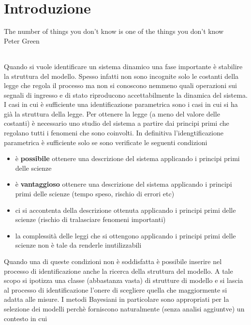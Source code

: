 \documentclass[10pt,a4paper,oneside,openany]{book}
\begin{document}
\chapter{Introduzione}
\begin{minipage}{0.5\textwidth}
\noindent
The number of things you don't know is one of the things you don't know\vspace{1em}\\Peter Green
\end{minipage}\vspace{3em}\\
Quando si vuole identificare un sistema dinamico una fase importante è stabilire la struttura del modello. Spesso infatti non sono incognite solo le costanti della legge che regola il processo ma non si conoscono nemmeno quali operazioni sui segnali di ingresso e di stato riproducono accettabilmente la dinamica del sistema.\\
I casi in cui è sufficiente una identificazione parametrica sono i casi in cui si ha già la struttura della legge. Per ottenere la legge (a meno del valore delle costanti) è necessario uno studio del sistema a partire dai principi primi che regolano tutti i fenomeni che sono coinvolti. In definitiva l'idengtificazione parametrica è sufficiente solo se sono verificate le seguenti condizioni
\begin{itemize}
\item è \textbf{possibile} ottenere una descrizione del sistema applicando i principi primi delle scienze
\item è \textbf{vantaggioso} ottenere una descrizione del sistema applicando i principi primi delle scienze (tempo speso, rischio di errori etc)
\item ci si accontenta della descrizione ottenuta applicando i principi primi delle scienze (rischio di tralasciare fenomeni importanti)
\item la complessità delle leggi che si ottengono applicando i principi primi delle scienze non è tale da renderle inutilizzabili
\end{itemize}
Quando una di queste condizioni non è soddisfatta è possibile inserire nel processo di identificazione anche la ricerca della struttura del modello.
A tale scopo si ipotizza una classe (abbastanza vasta) di strutture di modello
e si lascia al processo di identificazione l’onere di scegliere quella che maggiormente si adatta
alle misure. I metodi Bayesiani in particolare sono appropriati per la selezione dei
modelli perchè forniscono naturalmente (senza analisi aggiuntve) un contesto in cui
\end{document}
